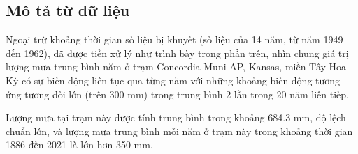 \documentclass[a4paper]{article}
\begin{document}
\subsection{Mô tả từ dữ liệu}
Ngoại trừ khoảng thời gian số liệu bị khuyết (số liệu của 14 năm, từ năm 1949 đến 1962), đã được tiền xử lý như trình bày trong phần trên, nhìn chung giá trị lượng mưa trung bình năm ở trạm Concordia Muni AP, Kansas, miền Tây Hoa Kỳ có sự biến động liên tục qua từng năm với những khoảng biến động tương ứng tương đối lớn (trên 300 mm) trong trung bình 2 lần trong 20 năm liên tiếp. 

Lượng mưa tại trạm này được tính trung bình trong khoảng 684.3 mm, độ lệch chuẩn lớn, và lượng mưa trung bình mỗi năm ở trạm này trong khoảng thời gian 1886 đến 2021 là lớn hơn 350 mm.
\end{document}
